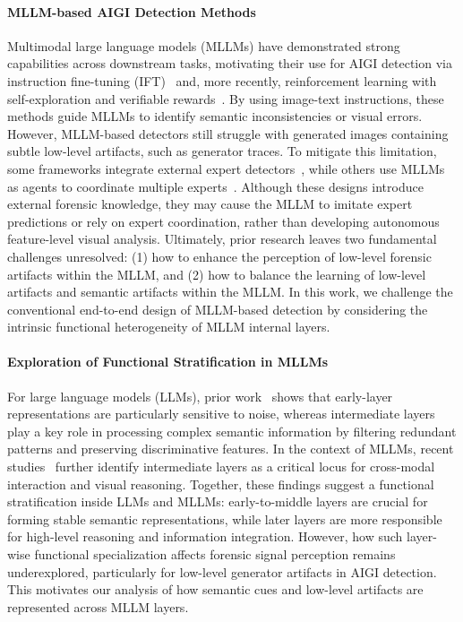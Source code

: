 \documentclass{article}
\theoremstyle{plain}
\theoremstyle{definition}
\theoremstyle{remark}
\begin{document}
\paragraph{MLLM-based AIGI Detection Methods}
Multimodal large language models (MLLMs) have demonstrated strong capabilities across downstream tasks, motivating their use for AIGI detection via instruction fine-tuning (IFT)~\citep{legion, FakeReasoning, SpotFake, lin2025guard, he2025vlforgery} and, more recently, reinforcement learning with self-exploration and verifiable rewards~\cite{xu2025avatarshield,xu2026genshield,nguyen2025prpo}.
By using image-text instructions, these methods guide MLLMs to identify semantic inconsistencies or visual errors.
However, MLLM-based detectors still struggle with generated images containing subtle low-level artifacts, such as generator traces.
To mitigate this limitation, some frameworks integrate external expert detectors~\citep{chen2024x2, zhou2025aigi, peng2025mllm}, while others use MLLMs as agents to coordinate multiple experts~\cite{zhu2026evoguard,yu2026agentfox}.
Although these designs introduce external forensic knowledge, they may cause the MLLM to imitate expert predictions or rely on expert coordination, rather than developing autonomous feature-level visual analysis.
Ultimately, prior research leaves two fundamental challenges unresolved: (1) how to enhance the perception of low-level forensic artifacts within the MLLM, and (2) how to balance the learning of low-level artifacts and semantic artifacts within the MLLM.
In this work, we challenge the conventional end-to-end design of MLLM-based detection by considering the intrinsic functional heterogeneity of MLLM internal layers.



\vspace*{-2mm}

\paragraph{Exploration of Functional Stratification in MLLMs}
For large language models (LLMs), prior work~\cite{skean2025layer} shows that early-layer representations are particularly sensitive to noise, whereas intermediate layers play a key role in processing complex semantic information by filtering redundant patterns and preserving discriminative features.
In the context of MLLMs, recent studies~\cite{jiang2025devils, hartman2025skip} further identify intermediate layers as a critical locus for cross-modal interaction and visual reasoning.
Together, these findings suggest a functional stratification inside LLMs and MLLMs: early-to-middle layers are crucial for forming stable semantic representations, while later layers are more responsible for high-level reasoning and information integration.
However, how such layer-wise functional specialization affects forensic signal perception remains underexplored, particularly for low-level generator artifacts in AIGI detection.
This motivates our analysis of how semantic cues and low-level artifacts are represented across MLLM layers.
\end{document}
